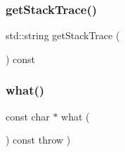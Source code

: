 \subsubsection{\texorpdfstring{get\+Stack\+Trace()}{getStackTrace()}}
{\footnotesize\ttfamily std\+::string get\+Stack\+Trace (\begin{DoxyParamCaption}{ }\end{DoxyParamCaption}) const\hspace{0.3cm}{\ttfamily [virtual]}}

\mbox{\label{classErrorException_a8d4b96162e93e11e5816d83702578af8}} 
\subsubsection{\texorpdfstring{what()}{what()}}
{\footnotesize\ttfamily const char $\ast$ what (\begin{DoxyParamCaption}{ }\end{DoxyParamCaption}) const throw  ) \hspace{0.3cm}{\ttfamily [virtual]}}

